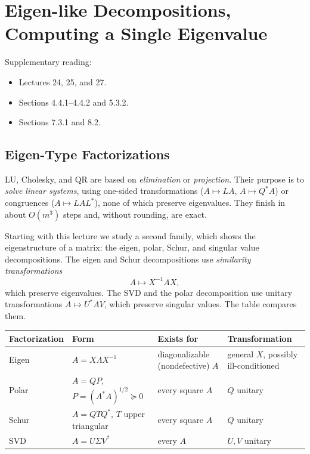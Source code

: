\chapter{Eigen-like Decompositions, Computing a Single Eigenvalue}
\label{ch:eigen}

Supplementary reading:
\begin{itemize}
  \item \cite{TB} Lectures 24, 25, and 27.
  \item \cite{Demmel} Sections 4.4.1--4.4.2 and 5.3.2.
  \item \cite{GVL} Sections 7.3.1 and 8.2.
\end{itemize}

\section{Eigen-Type Factorizations}

LU, Cholesky, and QR are based on \emph{elimination} or \emph{projection}. Their purpose is to \emph{solve linear systems}, using one-sided transformations ($A \mapsto LA$, $A \mapsto Q^\ast A$) or congruences ($A \mapsto LAL^\ast$), none of which preserve eigenvalues. They finish in about $O(m^3)$ steps and, without rounding, are exact.

Starting with this lecture we study a second family, which shows the eigenstructure of a matrix: the eigen, polar, Schur, and singular value decompositions. The eigen and Schur decompositions use \emph{similarity transformations}
\begin{equation*}
  A \mapsto X^{-1}AX,
\end{equation*}
which preserve eigenvalues. The SVD and the polar decomposition use unitary transformations $A \mapsto U^\ast AV$, which preserve singular values. The table compares them.

\begin{center}
\small
\begin{tabular}{@{}l l >{\raggedright\arraybackslash}p{} >{\raggedright\arraybackslash}p{}@{}}
  \toprule
  Factorization & Form & Exists for & Transformation \\
  \midrule
  Eigen & $A = X\Lambda X^{-1}$ & diagonalizable (nondefective) $A$ & general $X$, possibly ill-conditioned \\
  Polar & $A = QP$, $P = (A^\ast A)^{1/2} \succeq 0$ & every square $A$ & $Q$ unitary \\
  Schur & $A = QTQ^\ast$, $T$ upper triangular & every square $A$ & $Q$ unitary \\
  SVD & $A = U\Sigma V^\ast$ & every $A$ & $U, V$ unitary \\
  \bottomrule
\end{tabular}
\end{center}

